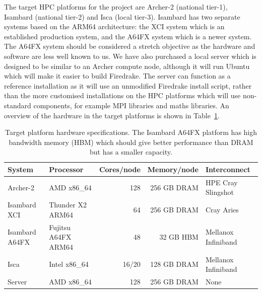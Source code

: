 \documentclass[a4paper,titlepage]{article}
\begin{document}
The target HPC platforms for the project are Archer-2 (national tier-1), Isambard (national tier-2) and Isca (local tier-3). Isambard has two separate systems based on the ARM64 architecture: the XCI system which is an established production system, and the A64FX system which is a newer system. The A64FX system should be considered a stretch objective as the hardware and software are less well known to us. We have also purchased a local server which is designed to be similar to an Archer compute node, although it will run Ubuntu which will make it easier to build Firedrake. The server can function as a reference installation as it will use an unmodified Firedrake install script, rather than the more customised installations on the HPC platforms which will use non-standard components, for example MPI libraries and maths libraries. An overview of the hardware in the target platforms is shown in Table~\ref{tab:hardware}.
%
\begin{table}[htp]
\begin{center}
\begin{tabular}{|l|l|r|r|l|}
\hline 
System         & Processor        & Cores/node & Memory/node     & Interconnect \\
\hline
Archer-2       & AMD x86\_64         & 128        & 256 GB DRAM  & HPE Cray Slingshot  \\
Isambard XCI   & Thunder X2 ARM64    &  64        & 256 GB DRAM  & Cray Aries          \\
Isambard A64FX & Fujitsu A64FX ARM64 & 48         & 32 GB HBM    & Mellanox Infiniband \\
Isca           & Intel x86\_64       & 16/20      & 128 GB DRAM  & Mellanox Infiniband \\
Server         & AMD x86\_64         & 128        & 256 GB DRAM  & None                \\
\hline
\end{tabular}
\end{center}
\caption{Target platform hardware specifications. The Isambard A64FX platform has high bandwidth memory (HBM) which should give better performance than DRAM but has a smaller capacity.}
\label{tab:hardware}
\end{table}%
\end{document}
